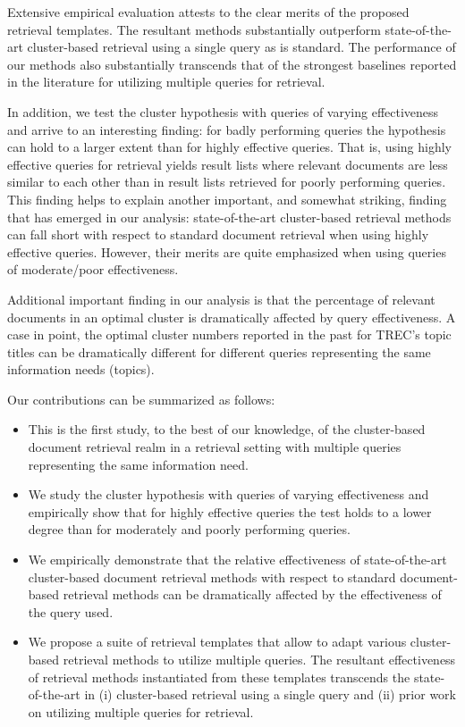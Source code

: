 Extensive empirical evaluation attests to the clear merits of the
proposed retrieval templates. The resultant methods substantially outperform state-of-the-art cluster-based
retrieval using a single query as is standard. The performance of our methods also substantially 
transcends that of the strongest baselines reported in the literature for utilizing multiple
queries for retrieval.

In addition, we test the cluster hypothesis with queries of varying
effectiveness and arrive to an interesting finding: for badly
performing queries the hypothesis can hold to a larger extent than for
highly effective queries. That is, using highly effective queries for retrieval yields result lists
where relevant documents are less similar to each other than in result lists retrieved for
poorly performing queries. This finding helps to explain another important, and somewhat striking, finding that has emerged in our analysis: state-of-the-art
cluster-based retrieval methods can fall short with respect to
standard document retrieval when using highly effective
queries. However, their merits are quite emphasized when using queries
of moderate/poor effectiveness.

Additional important finding in our analysis is that the percentage of 
relevant documents in an optimal cluster is dramatically affected by query effectiveness. A case in
point, the optimal cluster numbers reported in the past for TREC's
topic titles \cite{Liu+Croft:06b,Kurland+Domshlak:08a} can be dramatically different for different queries representing the same information needs (topics). 



Our contributions can be summarized as follows:
\begin{itemize}
\item This is the first study, to the best of our knowledge, of the
  cluster-based document retrieval realm in a retrieval setting with
  multiple queries representing the same information need.
\item We study the cluster hypothesis with queries of varying
  effectiveness and empirically show that for highly effective queries
  the test holds to a lower degree than for moderately and poorly
  performing queries.
\item We empirically demonstrate that the relative effectiveness of state-of-the-art cluster-based document retrieval methods with respect to standard document-based retrieval methods can be dramatically affected by the effectiveness of the query used.
\item We propose a suite of retrieval templates that allow to adapt
  various cluster-based retrieval methods to utilize multiple queries. The resultant effectiveness
  of retrieval methods instantiated from these templates transcends
  the state-of-the-art in (i) cluster-based retrieval using a single query and (ii) prior work on utilizing multiple queries for retrieval.
\end{itemize}




